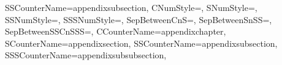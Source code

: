 {{    SSCounterName=appendixsubsection,%
  }{\GetAppendixSubSectionNumberingFormatString}%
  {%
    CNumStyle=\GetAppendixSSSTitleNumberFormatCNumStyle,%
    SNumStyle=\GetAppendixSSSTitleNumberFormatSNumStyle,%
    SSNumStyle=\GetAppendixSSSTitleNumberFormatSSNumStyle,%
    SSSNumStyle=\GetAppendixSSSTitleNumberFormatSSSNumStyle,%
    SepBetweenCnS=\GetAppendixSSSTitleNumberFormatSepBetweenCnS,%
    SepBetweenSnSS=\GetAppendixSSSTitleNumberFormatSepBetweenSnSS,%
    SepBetweenSSCnSSS=\GetAppendixSSSTitleNumberFormatSepBetweenSSCnSSS,%
    CCounterName=appendixchapter,%
    SCounterName=appendixsection,%
    SSCounterName=appendixsubsection,%
    SSSCounterName=appendixsubsubsection,%
  }{\GetAppendixSubSubSectionNumberingFormatString}%
} %

  \begin{comment}
  \SetupGeneralAppendixNumberFormatString{Figure}%
  {%
    CNumStyle=\GetCTitleNumberFormatCNumStyle,%
    CCounterName=chapter,%
    FigureNumStyle=Arabic,%
    FigureCounterName=figure,%
    FigureSep=\GetSSTitleNumberFormatSepAtIndex,%
  }{\GetGeneralFigureNumberFormatString}%
  \SetupGeneralAppendixNumberFormatString{AppendixFigure}%
  {%
    CNumStyle=\GetAppendixCTitleNumberFormatCNumStyle,%
    CCounterName=appendixchapter,%
    FigureNumStyle=Arabic,%
    FigureCounterName=figure,%
    FigureSep=\GetSSTitleNumberFormatSepAtIndex,%
  }{\GetAppendixFigureNumberFormatString}%
  \SetupGeneralAppendixNumberFormatString{Table}%
  {%
    CNumStyle=\GetCTitleNumberFormatCNumStyle,%
    CCounterName=chapter,%
    TableNumStyle=Arabic,%
    TableCounterName=table,%
    TableSep=\GetSSTitleNumberFormatSepAtIndex,%
  }{\GetGeneralTableNumberFormatString}%
  \SetupGeneralAppendixNumberFormatString{AppendixTable}%
  {%
    CNumStyle=\GetAppendixCTitleNumberFormatCNumStyle,%
    CCounterName=appendixchapter,%
    TableNumStyle=Arabic,%
    TableCounterName=table,%
    TableSep=\GetSSTitleNumberFormatSepAtIndex,%
  }{\GetAppendixTableNumberFormatString}%
  \SetupGeneralAppendixNumberFormatString{Equation}%
  {%
    CNumStyle=\GetCTitleNumberFormatCNumStyle,%
    CCounterName=chapter,%
    EquationNumStyle=Arabic,%
    EquationCounterName=equation,%
    EquationSep=\GetSSTitleNumberFormatSepAtIndex,%
  }{\GetGeneralEquationNumberFormatString}%
  \SetupGeneralAppendixNumberFormatString{AppendixEquation}%
  {%
    CNumStyle=\GetAppendixCTitleNumberFormatCNumStyle,%
    CCounterName=appendixchapter,%
    EquationNumStyle=Arabic,%
    EquationCounterName=equation,%
    EquationSep=\GetSSTitleNumberFormatSepAtIndex,%
  }{\GetAppendixEquationNumberFormatString}%
  \end{comment}

